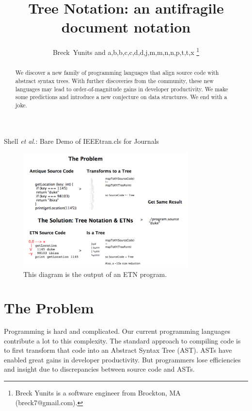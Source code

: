 \documentclass[journal]{IEEEtran}
\begin{document}
\title{Tree Notation: an antifragile document notation}

\author{Breck~Yunits and a,b,b,c,c,d,d,j,m,m,n,n,p,t,t,x%
\thanks{Breck Yunits is a software engineer from Brockton, MA (breck7@gmail.com).}%
}

%
{Shell \MakeLowercase{\textit{et al.}}: Bare Demo of IEEEtran.cls for Journals}

\maketitle


\begin{abstract}
We discover a new family of programming languages that align source code with abstract syntax trees. With further discoveries from the community, these new languages may lead to order-of-magnitude gains in developer productivity. We make some predictions and introduce a new conjecture on data structures. We end with a joke.

\end{abstract}

\IEEEpeerreviewmaketitle

\begin{figure}[ht!]
\centering
\includegraphics[width=90mm]{treenotation.png}
\caption{This diagram is the output of an ETN program.}
\end{figure}

\section{The Problem}

Programming is hard and complicated. Our current programming languages contribute a lot to this complexity. The standard approach to compiling code is to first transform that code into an Abstract Syntax Tree (AST). ASTs have enabled great gains in developer productivity. But programmers lose efficiencies and insight due to discrepancies between source code and ASTs.
\end{document}
